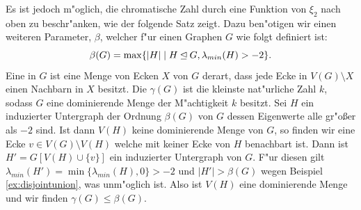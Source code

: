 Es ist jedoch m"oglich, die chromatische Zahl durch eine Funktion von $\xi_2$ nach oben zu beschr"anken, wie der folgende Satz zeigt. Dazu ben"otigen wir einen weiteren Parameter, $\beta$, welcher f"ur einen Graphen $G$ wie folgt definiert ist:
$$\beta(G) = \max\{|H| \;|\; H\unlhd G, \lambda_{min}(H) > -2 \}.$$
Eine  in $G$ ist eine Menge von Ecken $X$ von $G$ derart, dass jede Ecke in $V(G)\setminus X$ einen Nachbarn in $X$ besitzt. 
Die  $\gamma(G)$ ist die kleinste nat"urliche Zahl $k$, sodass $G$ eine dominierende Menge der M"achtigkeit $k$ besitzt. 
Sei $H$ ein induzierter Untergraph der Ordnung $\beta(G)$ von $G$ dessen Eigenwerte alle gr"o{\ss}er als $-2$ sind. Ist dann $V(H)$ keine dominierende Menge von $G$, so finden wir eine Ecke $v\in V(G) \setminus V(H)$ welche mit keiner Ecke von $H$ benachbart ist.
Dann ist $H'=G[V(H)\cup \{v\}]$ ein induzierter Untergraph von $G$. F"ur diesen gilt $\lambda_{min}(H') = \min\{\lambda_{min}(H), 0\} > -2$ und $|H'| > \beta(G)$ wegen Beispiel \ref{ex:disjointunion}, was unm"oglich ist.
Also ist $V(H)$ eine dominierende Menge und wir finden $\gamma (G) \leq \beta(G)$. 

